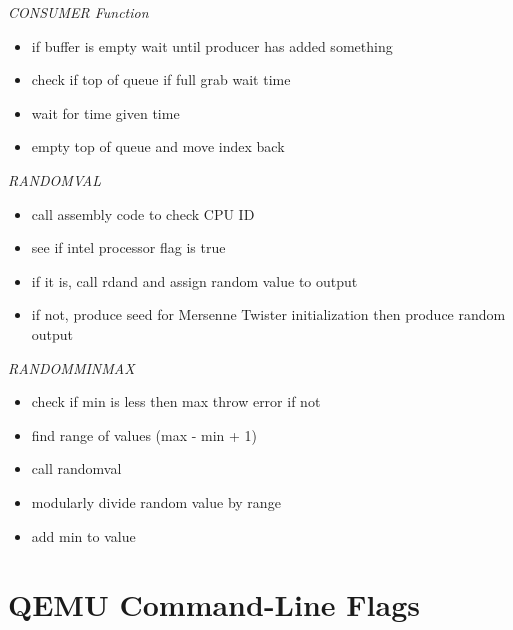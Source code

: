 \documentclass[letterpaper,10pt,titlepage]{article}
\begin{document}
\textit{\large{CONSUMER Function}}
\begin{itemize}
	\item if buffer is empty wait until producer has added something
    \item check if top of queue if full grab wait time
    \item wait for time given time
    \item empty top of queue and move index back

\end{itemize}

\textit{\large{RANDOMVAL}}
\begin{itemize}
	\item call assembly code to check CPU ID
    \item see if intel processor flag is true
    \item if it is, call rdand and assign random value to output
    \item if not, produce seed for Mersenne Twister initialization then produce random output

\end{itemize}

\textit{\large{RANDOMMINMAX}}
\begin{itemize}
	\item check if min is less then max throw error if not
    \item find range of values (max - min + 1)
    \item call randomval
    \item modularly divide random value by range
    \item add min to value

\end{itemize}

\section{QEMU Command-Line Flags}
\end{document}
